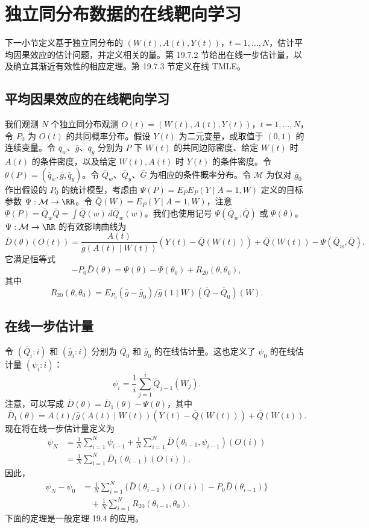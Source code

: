 \section{独立同分布数据的在线靶向学习}

下一小节定义基于独立同分布的 $(W(t),A(t),Y(t))$，$t=1,\ldots,N$，估计平均因果效应的估计问题，并定义相关的量。第 19.7.2 节给出在线一步估计量，以及确立其渐近有效性的相应定理。第 19.7.3 节定义在线 TMLE。

\subsection{平均因果效应的在线靶向学习}

我们观测 $N$ 个独立同分布观测 $O(t)=(W(t),A(t),Y(t))$，$t=1,\ldots,N$，令 $P_0$ 为 $O(t)$ 的共同概率分布。假设 $Y(t)$ 为二元变量，或取值于 $(0,1)$ 的连续变量。令 $\bar q_w$、$\bar g$、$\bar q_y$ 分别为 $P$ 下 $W(t)$ 的共同边际密度、给定 $W(t)$ 时 $A(t)$ 的条件密度，以及给定 $W(t),A(t)$ 时 $Y(t)$ 的条件密度。令 $\theta(P)=(\bar q_w,\bar g,\bar q_y)$。令 $\bar Q_w$、$\bar Q_y$、$\bar G$ 为相应的条件概率分布。令 $\mathcal M$ 为仅对 $\bar g_0$ 作出假设的 $P_0$ 的统计模型，考虑由 $\Psi(P)=E_PE_P(Y\mid A=1,W)$ 定义的目标参数 $\Psi:\mathcal M\to\RR$。令 $\bar Q(W)=E_P(Y\mid A=1,W)$，注意 $\Psi(P)=\bar Q_w\bar Q=\int\bar Q(w)\,d\bar Q_w(w)$。我们也使用记号 $\Psi(\bar Q_w,\bar Q)$ 或 $\Psi(\theta)$。$\Psi:\mathcal M\to\RR$ 的有效影响曲线为
\[
 \bar D(\theta)(O(t))
 =\frac{A(t)}{\bar g(A(t)\mid W(t))}(Y(t)-\bar Q(W(t)))
 +\bar Q(W(t))-\Psi(\bar Q_w,\bar Q).
\]
它满足恒等式
\[
 -P_0\bar D(\theta)=\Psi(\theta)-\Psi(\theta_0)+R_{20}(\theta,\theta_0),
\]
其中
\[
 R_{20}(\theta,\theta_0)
 =E_{P_0}(\bar g-\bar g_0)/\bar g(1\mid W)(\bar Q-\bar Q_0)(W).
\]

\subsection{在线一步估计量}

令 $(\bar Q_i:i)$ 和 $(\bar g_i:i)$ 分别为 $\bar Q_0$ 和 $\bar g_0$ 的在线估计量。这也定义了 $\psi_0$ 的在线估计量 $(\psi_i:i)$：
\[
 \psi_i=\frac1i\sum_{j=1}^i\bar Q_{j-1}(W_j).
\]
注意，可以写成 $\bar D(\theta)=\bar D_1(\theta)-\Psi(\theta)$，其中
\[
 \bar D_1(\theta)=A(t)/\bar g(A(t)\mid W(t))(Y(t)-\bar Q(W(t)))+\bar Q(W(t)).
\]
现在将在线一步估计量定义为
\[
\begin{aligned}
 \psi_N&=\frac1N\sum_{i=1}^N\psi_{i-1}
 +\frac1N\sum_{i=1}^N\bar D(\theta_{i-1},\psi_{i-1})(O(i))\\
 &=\frac1N\sum_{i=1}^N\bar D_1(\theta_{i-1})(O(i)).
\end{aligned}
\]
因此，
\begin{equation}
\begin{aligned}
 \psi_N-\psi_0
 &=\frac1N\sum_{i=1}^N\{\bar D(\theta_{i-1})(O(i))-P_0\bar D(\theta_{i-1})\}\\
 &\quad+\frac1N\sum_{i=1}^N R_{20}(\theta_{i-1},\theta_0).
\end{aligned}
 \tag{19.8}
\end{equation}
下面的定理是一般定理 19.4 的应用。

